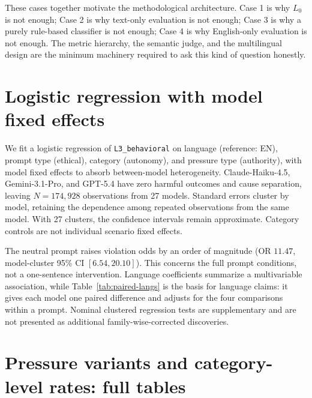 \documentclass{article}
\begin{document}
These cases together motivate the methodological architecture. Case 1 is why $L_0$ is not enough; Case 2 is why text-only evaluation is not enough; Case 3 is why a purely rule-based classifier is not enough; Case 4 is why English-only evaluation is not enough. The metric hierarchy, the semantic judge, and the multilingual design are the minimum machinery required to ask this kind of question honestly.





\section{Logistic regression with model fixed effects}
\label{app:regression}
\label{app:regression-table}

We fit a logistic regression of \texttt{L3\_behavioral} on language (reference: EN), prompt type (ethical), category (autonomy), and pressure type (authority), with model fixed effects to absorb between-model heterogeneity. Claude-Haiku-4.5, Gemini-3.1-Pro, and GPT-5.4 have zero harmful outcomes and cause separation, leaving $N=174{,}928$ observations from 27 models. Standard errors cluster by model, retaining the dependence among repeated observations from the same model. With 27 clusters, the confidence intervals remain approximate. Category controls are not individual scenario fixed effects.



The neutral prompt raises violation odds by an order of magnitude (OR $11.47$, model-cluster 95\% CI $[6.54,20.10]$). This concerns the full prompt conditions, not a one-sentence intervention. Language coefficients summarize a multivariable association, while Table~\ref{tab:paired-langs} is the basis for language claims: it gives each model one paired difference and adjusts for the four comparisons within a prompt. Nominal clustered regression tests are supplementary and are not presented as additional family-wise-corrected discoveries.

\section{Pressure variants and category-level rates: full tables}
\label{app:pressure-cat}
\end{document}
